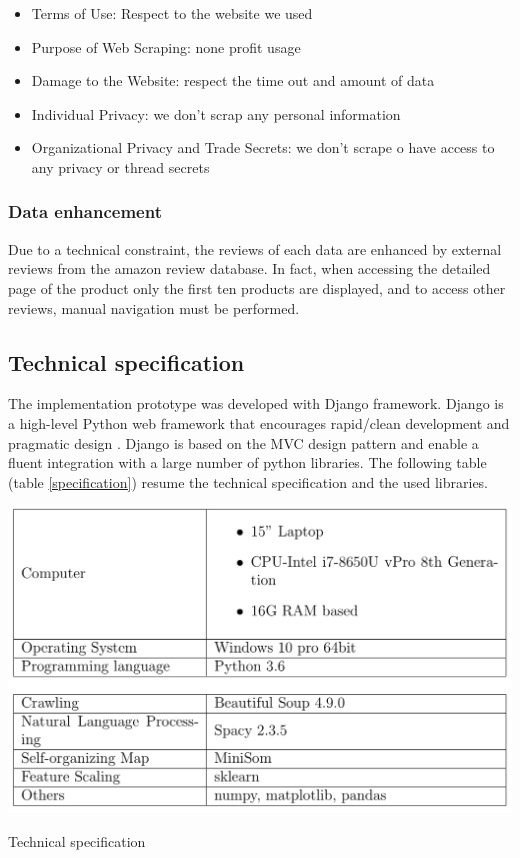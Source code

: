 \documentclass[preprint,3p,onecolumn]{elsarticle}
\begin{document}
\begin{itemize}
\item Terms of Use: Respect to the website we used
\item Purpose of Web Scraping: none profit usage
\item Damage to the Website: respect the time out and amount of data
\item Individual Privacy: we don't scrap any personal information
\item Organizational Privacy and Trade Secrets: we don't scrape o have access to any privacy or thread secrets
\end{itemize}
\subsubsection{Data enhancement}
\par Due to a technical constraint, the reviews of each data are enhanced by external reviews from the amazon review database. In fact, when accessing the detailed page of the product only the first ten products are displayed, and to access other reviews, manual navigation must be performed.




\subsection{Technical specification}

\par The implementation prototype was developed with Django framework. Django is a high-level Python web framework that encourages rapid/clean development and pragmatic design \citep {forcier2008python}. Django is based on the MVC design pattern \citep {leff2001web} and enable a fluent integration with a large number of python libraries. The following table (table \ref{specification}) resume the technical specification and the used libraries.

\begin{table}[H]
\centering
\includegraphics[scale=.4]{specification}
\caption{Technical specification}
\label{specification}
\end{table}
\end{document}
